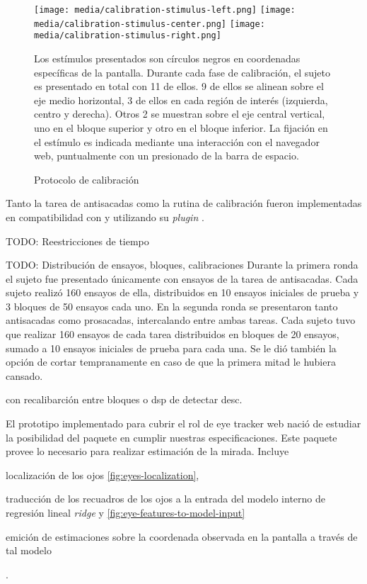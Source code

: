 \begin{figure}
    \centering

    \texttt{[image: media/calibration-stimulus-left.png]}
    \texttt{[image: media/calibration-stimulus-center.png]}
    \texttt{[image: media/calibration-stimulus-right.png]}

    Los estímulos presentados son círculos negros en coordenadas específicas de
    la pantalla.
    Durante cada fase de calibración, el sujeto es presentado en total con 11
    de ellos.
    9 de ellos se alinean sobre el eje medio horizontal, 3 de ellos en cada
    región de interés (izquierda, centro y derecha).
    Otros 2 se muestran sobre el eje central vertical, uno en el bloque
    superior y otro en el bloque inferior.
    La fijación en el estímulo es indicada mediante una interacción con el
    navegador web, puntualmente con un presionado de la barra de espacio.

    \caption{Protocolo de calibración}
    \label{fig:calibration-protocol}
\end{figure}

Tanto la tarea de antisacadas como la rutina de calibración fueron
implementadas en compatibilidad con \jspsych y utilizando su \textit{plugin}
\psychophysics.

TODO: Reestricciones de tiempo

TODO: Distribución de ensayos, bloques, calibraciones
Durante la primera ronda el sujeto fue presentado únicamente con ensayos de la
tarea de antisacadas.
Cada sujeto realizó 160 ensayos de ella, distribuidos en 10 ensayos iniciales
de prueba y 3 bloques de 50 ensayos cada uno.
En la segunda ronda se presentaron tanto antisacadas como prosacadas,
intercalando entre ambas tareas.
Cada sujeto tuvo que realizar 160 ensayos de cada tarea distribuidos en bloques
de 20 ensayos, sumado a 10 ensayos iniciales de prueba para cada una.
Se le dió también la opción de cortar tempranamente en caso de que la primera
mitad le hubiera cansado.

con recalibarción entre bloques o dsp de detectar desc.



El prototipo implementado para cubrir el rol de eye tracker web nació de
estudiar la posibilidad del paquete \webgazer en cumplir nuestras
especificaciones.
Este paquete provee lo necesario para realizar estimación de la mirada.
Incluye \begin{enumerate*}
  \item localización de los ojos \ref{fig:eyes-localization},
  \item traducción de los recuadros de los ojos a la entrada del modelo
    interno de regresión lineal \textit{ridge} y
    \ref{fig:eye-features-to-model-input}
  \item emición de estimaciones sobre la coordenada observada en la pantalla a
    través de tal modelo
\end{enumerate*}.

